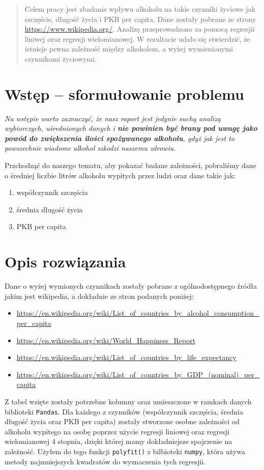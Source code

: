 \documentclass[10pt]{article}
\begin{document}


\begin{abstract}
Celem pracy jest zbadanie wpływu alkoholu na takie czynniki życiowe jak szczęście, długość życia i PKB per capita.
Dane zostały pobrane ze strony \url{https://www.wikipedia.org/}.
Analizę przeprowadzono za pomocą regresjii liniwej oraz regresji wielomianowej.
W rezultacie udało się stwierdzić, że istnieje pewna zależność między alkoholem, a wyżej wymienionymi czynnikami życiowymi.
\end{abstract}

\section{Wstęp -- sformułowanie problemu}
\label{sec:wstep}

\textit{Na wstępie warto zaznaczyć, że nasz raport jest jedynie suchą analizą wybiorczych, uśrednionych danych i \textbf{nie powinien być brany pod uwagę jako powód do zwiększenia ilości spożywanego alkoholu}, gdyż jak jest to powszechnie wiadome alkohol szkodzi naszemu zdrowiu.}

Przchodząć do naszego tematu, aby pokazać badane zależności, pobraliśmy dane o średniej liczbie litrów alkoholu wypitych przez ludzi oraz dane takie jak:
\begin{enumerate}
    \item współczynnik szczęścia
    \item średnia długość życia
    \item PKB per capita
\end{enumerate}

\section{Opis rozwiązania}

Dane o wyżej wymionych czynnikach zostały pobrane z ogólnodostępnego źródła jakim jest wikipedia, a dokładnie ze stron podanych poniżej:
\begin{itemize}
    \item \url{https://en.wikipedia.org/wiki/List_of_countries_by_alcohol_consumption_per_capita}
    \item \url{https://en.wikipedia.org/wiki/World_Happiness_Report}
    \item \url{https://en.wikipedia.org/wiki/List_of_countries_by_life_expectancy}
    \item \url{https://en.wikipedia.org/wiki/List_of_countries_by_GDP_(nominal)_per_capita}
\end{itemize}
Z tabel wzięte zostały potrzebne kolumny oraz umieszczone w ramkach danych biblioteki \texttt{Pandas}.
Dla każdego z czynników (współczynnik szczęścia, średnia długość życia oraz PKB per capita) zostały stworzone osobne zależności od alkoholu wypitego na osobę poprzez użycie regresji liniowej oraz regresji wielomianowej 4 stopnia, dzięki której mamy dokładniejsze spojrzenie na zależność.
Użyłem do tego funkcji \texttt{polyfit()} z bilbioteki \texttt{numpy}, która używa metody najmniejszych kwadratów do wyznaczenia tych regresjii.
\pagebreak
\end{document}
